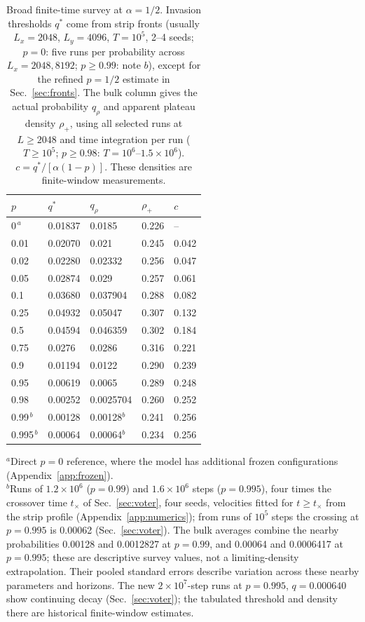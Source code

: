 \documentclass[pre,twocolumn,superscriptaddress,showpacs,floatfix]{revtex4-2}
\newcommand{\qs}{q^{*}}
\begin{document}
\begin{table}
\caption{Broad finite-time survey at $\alpha=1/2$. Invasion thresholds
$\qs$ come from strip fronts (usually $L_x=2048$, $L_y=4096$, $T=10^5$,
2--4 seeds; $p=0$: five runs per probability across $L_x=2048,8192$;
$p\ge0.99$: note $b$), except for the refined $p=1/2$
estimate in Sec.~\ref{sec:fronts}. The bulk column gives the actual probability
$q_\rho$ and apparent plateau density $\rho_+$, using all selected runs at
$L\ge2048$ and time integration per run ($T\ge10^5$;
$p\ge0.98$: $T=10^6$--$1.5\times10^6$).
$c=\qs/[\alpha(1-p)]$. These densities are finite-window measurements.}
\label{tab:line}
\begin{ruledtabular}
\begin{tabular}{lllll}
$p$ & $\qs$ & $q_\rho$ & $\rho_+$ & $c$ \\
\hline
$0^{\,a}$ & 0.01837 & 0.0185 & 0.226 & -- \\
0.01 & 0.02070 & 0.021 & 0.245 & 0.042 \\
0.02 & 0.02280 & 0.02332 & 0.256 & 0.047 \\
0.05 & 0.02874 & 0.029 & 0.257 & 0.061 \\
0.1 & 0.03680 & 0.037904 & 0.288 & 0.082 \\
0.25 & 0.04932 & 0.05047 & 0.307 & 0.132 \\
0.5 & 0.04594 & 0.046359 & 0.302 & 0.184 \\
0.75 & 0.0276 & 0.0286 & 0.316 & 0.221 \\
0.9 & 0.01194 & 0.0122 & 0.290 & 0.239 \\
0.95 & 0.00619 & 0.0065 & 0.289 & 0.248 \\
0.98 & 0.00252 & 0.0025704 & 0.260 & 0.252 \\
0.99$^{\,b}$ & 0.00128 & 0.00128$^{b}$ & 0.241 & 0.256 \\
0.995$^{\,b}$ & 0.00064 & 0.00064$^{b}$ & 0.234 & 0.256 \\
\end{tabular}
\end{ruledtabular}
\begin{flushleft}\footnotesize
$^{a}$Direct $p=0$ reference, where the model has additional frozen configurations
(Appendix~\ref{app:frozen}).\\
$^{b}$Runs of $1.2\times10^6$ ($p = 0.99$) and $1.6\times10^6$ steps ($p = 0.995$), four times the
crossover time $t_\times$ of Sec.~\ref{sec:voter}, four seeds, velocities fitted for $t\ge t_\times$
from the strip profile (Appendix~\ref{app:numerics}); from runs of $10^5$ steps the
crossing at $p = 0.995$ is 0.00062 (Sec.~\ref{sec:voter}).
The bulk averages combine the nearby probabilities 0.00128 and 0.0012827 at
$p=0.99$, and 0.00064 and 0.0006417 at $p=0.995$; these are descriptive
survey values, not a limiting-density extrapolation. Their pooled standard
errors describe variation across these nearby parameters and horizons.
The new $2\times10^7$-step runs at $p=0.995$, $q=0.000640$ show
continuing decay (Sec.~\ref{sec:voter}); the tabulated threshold and density
there are historical finite-window estimates.
\end{flushleft}
\end{table}
\end{document}
